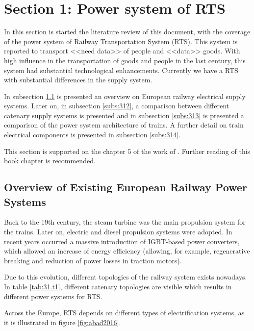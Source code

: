 




\section{Section 1: Power system of RTS}


In this section is started the literature review of this document, with the coverage of the power system of Railway Transportation System (RTS). This system is reported to transport <<need data>> of people and <<data>> goods. With high influence in the transportation of goods and people in the last century, this system had substantial technological enhancements. Currently we have a RTS with substantial differences in the supply system.

In subsection \ref{subs:311} is presented an overview on European railway electrical supply systems. Later on, in subsection \ref{subs:312}, a comparison between different catenary supply systems is presented and in subsection \ref{subs:313} is presented a comparison of the power system architecture of trains. A further detail on train electrical components is presented in subsection \ref{subs:314}.

This section is supported on the chapter 5 of the work of \cite{abad2016}. Further reading of this book chapter is recommended. 

\subsection{Overview of Existing European Railway Power Systems}
\label{subs:311}
Back to the 19th century, the steam turbine was the main propulsion system for the trains. Later on, electric and diesel propulsion systems were adopted. In recent years occurred a massive introduction of IGBT-based power converters, which allowed an increase of energy efficiency (allowing, for example, regenerative breaking and reduction of power losses in traction motors).

Due to this evolution, different topologies of the railway system exists nowadays. In table \ref{tab:31.t1}, different catenary topologies are visible which results in different power systems for RTS.




Across the Europe, RTS depends on different types of electrification systems, as it is illustrated in figure \ref{fig:abad2016}.


